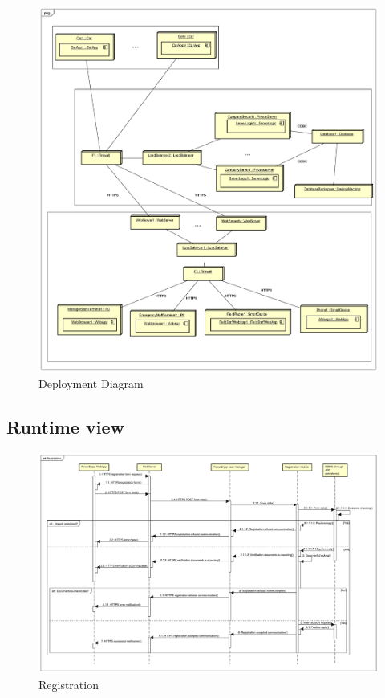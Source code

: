 \documentclass[english]{article}
\begin{document}
			\begin{figure}[H]
				\centering
				\includegraphics[scale=0.221875]{Deployment_Diagram.pdf}%
				\caption{Deployment Diagram}
			\end{figure}
			
			
	\begin{landscape}
	\subsection{Runtime view}%
		\begin{figure}[H]
				\centering
				\includegraphics[scale=0.22]{./SequenceDiagrams/Registration/Registration.pdf}%
				\caption{Registration}
		\end{figure}
	\end{landscape}
\end{document}
